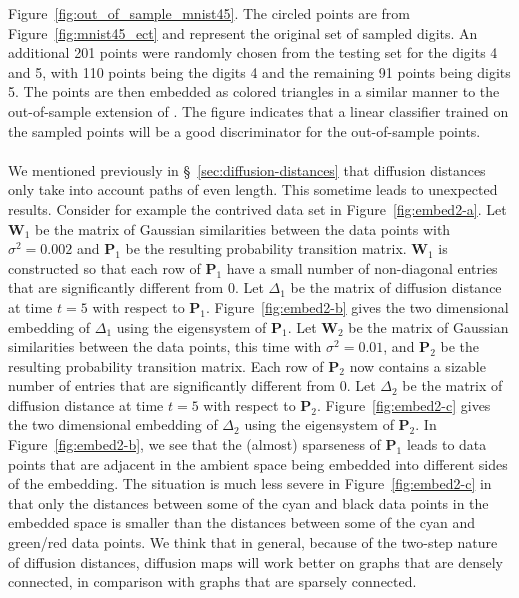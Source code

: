 \documentclass[10pt,twocolumn]{article}
\numberwithin{equation}{section}
\begin{document}
Figure~\ref{fig:out_of_sample_mnist45}. The circled points are from
Figure~\ref{fig:mnist45_ect} and represent the original set of sampled
digits. An additional 201 points were randomly chosen from the testing
set for the digits 4 and 5, with 110 points being the digits 4 and the
remaining 91 points being digits 5. The points are then embedded as
colored triangles in a similar manner to the out-of-sample extension
of \citet{bengio04:_out_lle_isomap_mds_eigen}. The figure indicates
that a linear classifier trained on the sampled points will be a good
discriminator for the out-of-sample points. \\ \\
\noindent We mentioned previously in \S~\ref{sec:diffusion-distances} that
diffusion distances only take into account paths of even length. This
sometime leads to unexpected results. Consider for example the
contrived data set in Figure~\ref{fig:embed2-a}. Let $\mathbf{W}_1$ be
the matrix of Gaussian similarities between the data points with
$\sigma^{2} = 0.002$ and $\mathbf{P}_1$ be the resulting probability
transition matrix. $\mathbf{W}_1$ is constructed so that each row of
$\mathbf{P}_1$ have a small number of non-diagonal entries that are
significantly different from $0$. Let $\Delta_{1}$ be the matrix of
diffusion distance at time $t = 5$ with respect to
$\mathbf{P}_1$. Figure~\ref{fig:embed2-b} gives the two dimensional
embedding of $\Delta_{1}$ using the eigensystem of $\mathbf{P}_1$. Let
$\mathbf{W}_2$ be the matrix of Gaussian similarities between the data
points, this time with $\sigma^{2} = 0.01$, and $\mathbf{P}_2$ be the
resulting probability transition matrix. Each row of $\mathbf{P}_2$
now contains a sizable number of entries that are significantly
different from $0$. Let $\Delta_{2}$ be the matrix of diffusion
distance at time $t = 5$ with respect to
$\mathbf{P}_2$. Figure~\ref{fig:embed2-c} gives the two dimensional
embedding of $\Delta_{2}$ using the eigensystem of $\mathbf{P}_2$. In
Figure~\ref{fig:embed2-b}, we see that the (almost) sparseness of
$\mathbf{P}_1$ leads to data points that are adjacent in the ambient
space being embedded into different sides of the embedding. The
situation is much less severe in Figure~\ref{fig:embed2-c} in that
only the distances between some of the cyan and black data points in
the embedded space is smaller than the distances between some of the
cyan and green/red data points. We think that in general, because of
the two-step nature of diffusion distances, diffusion maps will work
better on graphs that are densely connected, in comparison with graphs
that are sparsely connected. 
\end{document}
